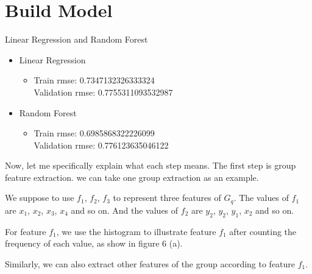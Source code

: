 \documentclass[
 size=14pt,
 paper=smartboard,  %
 mode=present, 		%
 display=slides, 	%
 style=tuliplab,  	%
 pauseslide,
 fleqn,leqno]{powerdot}
\begin{document}
\section{Build Model}
\begin{slide}[toc=,bm=]{Linear Regression and Random Forest}
    \begin{itemize}
      \item
      Linear Regression
      
      \begin{itemize}
      \item
      Train rmse: 0.7347132326333324\\
    Validation rmse: 0.7755311093532987
      
      
      
      \end{itemize}
      
      \item
      Random Forest
      
      \begin{itemize}
      \item
      Train rmse: 0.6985868322226099\\
  Validation rmse: 0.776123635046122
      
      \end{itemize}
      
      \end{itemize}
      
    
  
    
    \begin{note}
    Now, let me specifically explain what each step means.
    The first step is group feature extraction.
    we can take one group extraction as an example.
    
    We suppose to use $f_1$, $f_2$, $f_3$ to represent three features of $G_q$.
    The values of $f_1$ are {$x_1$, $x_2$, $x_3$, $x_4$} and so on.
    And the values of $f_2$ are {$y_2$, $y_2$, $y_1$, $x_2$} and so on.
    
    For feature $f_1$,
    we use the histogram to illustrate feature $f_1$ after
    counting the frequency of each value,
    as show in figure 6 (a).
    
    Similarly,
    we can also extract other features of the group
    according to feature $f_1$.
    \end{note}
    
    \end{slide}
\end{document}
